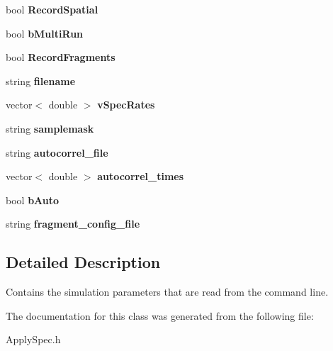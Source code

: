 \begin{DoxyCompactItemize}
\item 
bool {\bfseries Record\+Spatial}\hypertarget{struct_spec_sim_parameters_a0b4a9b33baecf59a37dcfbfd1ca1acf4}{}\label{struct_spec_sim_parameters_a0b4a9b33baecf59a37dcfbfd1ca1acf4}

\item 
bool {\bfseries b\+Multi\+Run}\hypertarget{struct_spec_sim_parameters_a7ca69d2db2aaf8cdcc62b1ec854f72bf}{}\label{struct_spec_sim_parameters_a7ca69d2db2aaf8cdcc62b1ec854f72bf}

\item 
bool {\bfseries Record\+Fragments}\hypertarget{struct_spec_sim_parameters_a333eafe4828c730a80cf15d353d3d416}{}\label{struct_spec_sim_parameters_a333eafe4828c730a80cf15d353d3d416}

\item 
string {\bfseries filename}\hypertarget{struct_spec_sim_parameters_a39beb88bb0ce36265bb0b8c8468cbe48}{}\label{struct_spec_sim_parameters_a39beb88bb0ce36265bb0b8c8468cbe48}

\item 
vector$<$ double $>$ {\bfseries v\+Spec\+Rates}\hypertarget{struct_spec_sim_parameters_ae585d5a9f02101e229763136926020eb}{}\label{struct_spec_sim_parameters_ae585d5a9f02101e229763136926020eb}

\item 
string {\bfseries samplemask}\hypertarget{struct_spec_sim_parameters_add68fe2a48b1d80173c5066bf9cd0f6c}{}\label{struct_spec_sim_parameters_add68fe2a48b1d80173c5066bf9cd0f6c}

\item 
string {\bfseries autocorrel\+\_\+file}\hypertarget{struct_spec_sim_parameters_a246590e1dfc7cfd7022de3a6d1a03794}{}\label{struct_spec_sim_parameters_a246590e1dfc7cfd7022de3a6d1a03794}

\item 
vector$<$ double $>$ {\bfseries autocorrel\+\_\+times}\hypertarget{struct_spec_sim_parameters_aa7408c516aaed227061b2f13a5c65d0f}{}\label{struct_spec_sim_parameters_aa7408c516aaed227061b2f13a5c65d0f}

\item 
bool {\bfseries b\+Auto}\hypertarget{struct_spec_sim_parameters_a201c13ba0043ac1602feddea020e4aa2}{}\label{struct_spec_sim_parameters_a201c13ba0043ac1602feddea020e4aa2}

\item 
string {\bfseries fragment\+\_\+config\+\_\+file}\hypertarget{struct_spec_sim_parameters_adef81f827b1402d19f318c66f295c62a}{}\label{struct_spec_sim_parameters_adef81f827b1402d19f318c66f295c62a}

\end{DoxyCompactItemize}


\subsection{Detailed Description}
Contains the simulation parameters that are read from the command line. 

The documentation for this class was generated from the following file\+:\begin{DoxyCompactItemize}
\item 
Apply\+Spec.\+h\end{DoxyCompactItemize}
